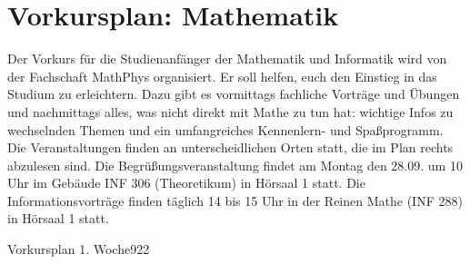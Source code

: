 \section{Vorkursplan: Mathematik}
\label{vkmathe}
Der Vorkurs für die Studienanfänger der Mathematik und Informatik wird von der
Fachschaft MathPhys organisiert. Er soll helfen, euch den Einstieg in das
Studium zu erleichtern. Dazu gibt es vormittags fachliche Vorträge und Übungen
und nachmittags alles, was nicht direkt mit Mathe zu tun hat: wichtige Infos zu
wechselnden Themen und ein umfangreiches Kennenlern- und Spaßprogramm. Die
Veranstaltungen finden an unterscheidlichen Orten statt, die im Plan rechts
abzulesen sind. Die Begrüßungsveranstaltung findet am Montag den 28.09. um 10
Uhr im Gebäude \gls{INF} 306 (Theoretikum) in Hörsaal 1 statt. Die
Informationsvorträge finden täglich 14 bis 15 Uhr in der Reinen Mathe
(\gls{INF} 288) in Hörsaal 1 statt. \clearpage



\begin{stundenplan}{Vorkursplan 1. Woche}{9}{22}






\end{stundenplan}


